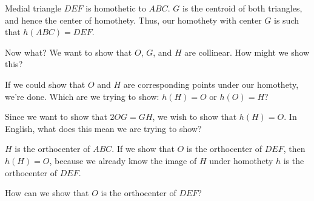 
Medial triangle $DEF$ is homothetic to $ABC$. $G$ is the centroid of both triangles, and hence the center of homothety. Thus, our homothety with center $G$ is such that $h(ABC) = DEF$.

Now what?  We want to show that $O$, $G$, and $H$ are collinear. How might we show this?


If we could show that $O$ and $H$ are corresponding points under our homothety, we're done. Which are we trying to show: $h(H) = O$ or $h(O) = H$?





Since we want to show that $2OG = GH$, we wish to show that $h(H) = O$. In English, what does this mean we are trying to show?






$H$ is the orthocenter of $ABC$. If we show that $O$ is the orthocenter of $DEF$, then $h(H) = O$, because we already know the image of $H$ under homothety $h$ is the orthocenter of $DEF$.

How can we show that $O$ is the orthocenter of $DEF$?


